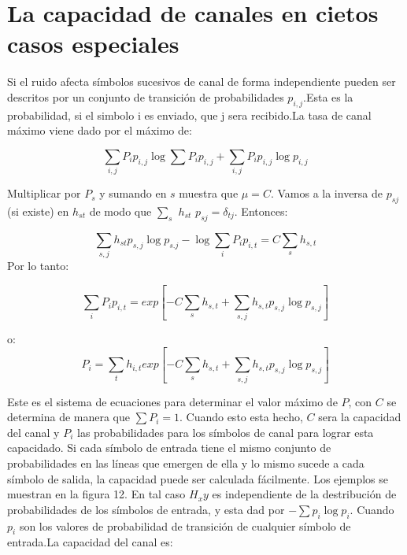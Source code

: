 \documentclass{article}
\begin{document}
\section{La capacidad de canales en cietos casos especiales}

Si el ruido afecta s\'imbolos sucesivos de canal de forma independiente pueden ser descritos por un conjunto de transici\'on 
de probabilidades $p_{i,j}$.Esta es la probabilidad, si el simbolo i es enviado, que j sera recibido.La tasa de canal m\'aximo 
viene dado por el m\'aximo de:

\begin{equation}
  \sum_{i,j}P_i p_{i,j} \log{\sum{P_i p_{i,j}}} + \sum_{i,j}P_i p_{i,j}\log{p_{i,j}}
\end{equation}
 
Multiplicar por $P_s$ y sumando en $s$ muestra que $\mu = C$. Vamos a la inversa de $p_{sj}$ (si existe) en $h_{st}$  de modo que 
$\sum_{s}$ $h_{st}$ $p_{sj} = \delta_{tj}$. Entonces: 

\begin{equation}
  \sum_{s,j}h_{st} p_{s,j} \log{p_{s.j}} - \log{\sum_{i}P_i p_{i,t}} = C \sum_{s} h_{s,t}
\end{equation}
Por lo tanto:

\begin{equation}
  \sum_{i} P_i p_{i,t} = exp[- C \sum_{s} h_{s,t}+ \sum_{s,j} h_{s,t} p_{s,j} \log{p_{s,j}}]
\end{equation}

o:  
\begin{equation}
  P_i = \sum_{t} h_{i,t} exp[ - C \sum_{s} h_{s,t}+ \sum_{s,j} h_{s,t} p_{s,j} \log{p_{s,j}} ]
\end{equation}


Este es el sistema de ecuaciones para determinar el valor m\'aximo de $P$, con $C$ se determina 
de manera que $\sum P_i = 1$. Cuando esto esta hecho, $C$ sera la capacidad del canal y $P_i$ las probabilidades 
para los s\'imbolos de canal para lograr esta capacidado.
Si cada s\'imbolo de entrada tiene el mismo conjunto de probabilidades en las l\'ineas que emergen de ella 
y lo mismo sucede a cada s\'imbolo de salida, la capacidad puede ser calculada f\'acilmente. Los ejemplos se muestran en la figura 12. 
En tal caso $H_xy$ es independiente de la destribuci\'on de probabilidades de los s\'imbolos de entrada, y esta dad por $-\sum p_i \log{p_i}$. 
Cuando $p_i$ son los valores de probabilidad de transici\'on de cualquier s\'imbolo de entrada.La capacidad del canal es:
\end{document}
